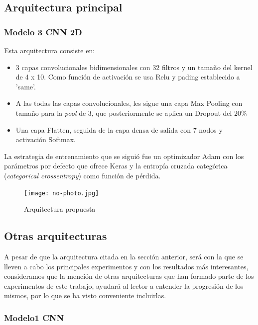 \documentclass[11pt,a4paper,spanish]{book}
\begin{document}
	\subsection{Arquitectura principal}
		\subsubsection{Modelo 3 CNN 2D}
		\label{cap4:Modelo3}
		Esta arquitectura consiste en:
		\begin{itemize}
			\item 3 capas convolucionales bidimensionales con 32 filtros y un tamaño del kernel de 4 x 10. Como función de activación se usa Relu y pading establecido a 'same'.
			
			\item A las todas las capas convolucionales, les sigue una capa Max Pooling con tamaño para la \emph{pool} de 3, que posteriormente se aplica un Dropout del 20\%
			
			\item Una capa Flatten, seguida de la capa densa de salida con 7 nodos y activación Softmax.
		\end{itemize}
		
		La estrategia de entrenamiento que se siguió fue un optimizador Adam con los parámetros por defecto que ofrece Keras y la entropía cruzada categórica (\emph{categorical crossentropy}) como función de pérdida.
		
		\begin{figure}[H]
			\centering
			\texttt{[image: no-photo.jpg]} 
			\caption{Arquitectura propuesta}
			\label{fig:lstm-cnn}
		\end{figure}
	
	
	\subsection{Otras arquitecturas}
	A pesar de que la arquitectura citada en la sección anterior, será con la que se lleven a cabo los principales experimentos y con los resultados más interesantes, consideramos que la mención de otras arquitecturas que han formado parte de los experimentos de este trabajo, ayudará al lector a entender la progresión de los mismos, por lo que se ha visto conveniente incluirlas.
	
		\subsubsection{Modelo1 CNN}
		\label{cap4:Modelo1}
	
\end{document}
